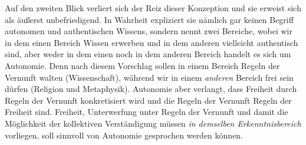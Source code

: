 Auf den zweiten Blick verliert sich der Reiz dieser Konzeption und sie erweist
sich als äußerst unbefriedigend. In Wahrheit expliziert sie nämlich gar keinen
Begriff autonomen und authentischen Wissens, sondern nennt zwei Bereiche, wobei
wir in dem einen Bereich Wissen erwerben und in dem anderen vielleicht
authentisch sind, aber weder in dem einen noch in dem anderen Bereich handelt es sich um
Autonomie. Denn nach diesem Vorschlag sollen in einem Bereich Regeln der
Vernunft walten (Wissenschaft), während wir in einem \emph{anderen} Bereich frei
sein dürfen (Religion und Metaphysik). Autonomie aber verlangt, dass Freiheit
durch Regeln der Vernunft konkretisiert wird und die Regeln der Vernunft Regeln der
Freiheit sind. Freiheit, Unterwerfung unter Regeln der Vernunft und damit die
Möglichkeit der kollektiven Verständigung müssen \emph{in demselben
Erkenntnisbereich} vorliegen, soll sinnvoll von Autonomie gesprochen werden
können.
 
